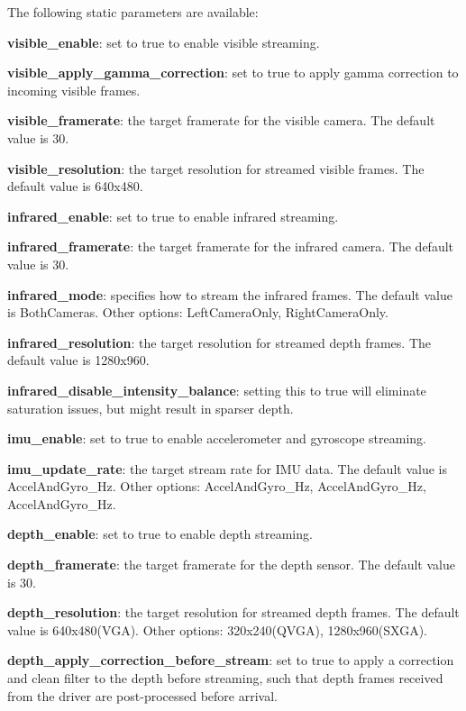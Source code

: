 The following static parameters are available\+:


\begin{DoxyItemize}
\item {\bfseries{visible\+\_\+enable}}\+: set to true to enable visible streaming.
\item {\bfseries{visible\+\_\+apply\+\_\+gamma\+\_\+correction}}\+: set to true to apply gamma correction to incoming visible frames.
\item {\bfseries{visible\+\_\+framerate}}\+: the target framerate for the visible camera. The default value is 30.
\item {\bfseries{visible\+\_\+resolution}}\+: the target resolution for streamed visible frames. The default value is 640x480.
\item {\bfseries{infrared\+\_\+enable}}\+: set to true to enable infrared streaming.
\item {\bfseries{infrared\+\_\+framerate}}\+: the target framerate for the infrared camera. The default value is 30.
\item {\bfseries{infrared\+\_\+mode}}\+: specifies how to stream the infrared frames. The default value is Both\+Cameras. Other options\+: Left\+Camera\+Only, Right\+Camera\+Only.
\item {\bfseries{infrared\+\_\+resolution}}\+: the target resolution for streamed depth frames. The default value is 1280x960.
\item {\bfseries{infrared\+\_\+disable\+\_\+intensity\+\_\+balance}}\+: setting this to true will eliminate saturation issues, but might result in sparser depth.
\item {\bfseries{imu\+\_\+enable}}\+: set to true to enable accelerometer and gyroscope streaming.
\item {\bfseries{imu\+\_\+update\+\_\+rate}}\+: the target stream rate for I\+MU data. The default value is Accel\+And\+Gyro\+\_\+Hz. Other options\+: Accel\+And\+Gyro\+\_\+Hz, Accel\+And\+Gyro\+\_\+Hz, Accel\+And\+Gyro\+\_\+Hz.
\item {\bfseries{depth\+\_\+enable}}\+: set to true to enable depth streaming.
\item {\bfseries{depth\+\_\+framerate}}\+: the target framerate for the depth sensor. The default value is 30.
\item {\bfseries{depth\+\_\+resolution}}\+: the target resolution for streamed depth frames. The default value is 640x480(\+V\+G\+A). Other options\+: 320x240(\+Q\+V\+G\+A), 1280x960(\+S\+X\+G\+A).
\item {\bfseries{depth\+\_\+apply\+\_\+correction\+\_\+before\+\_\+stream}}\+: set to true to apply a correction and clean filter to the depth before streaming, such that depth frames received from the driver are post-\/processed before arrival.

\end{DoxyItemize}
